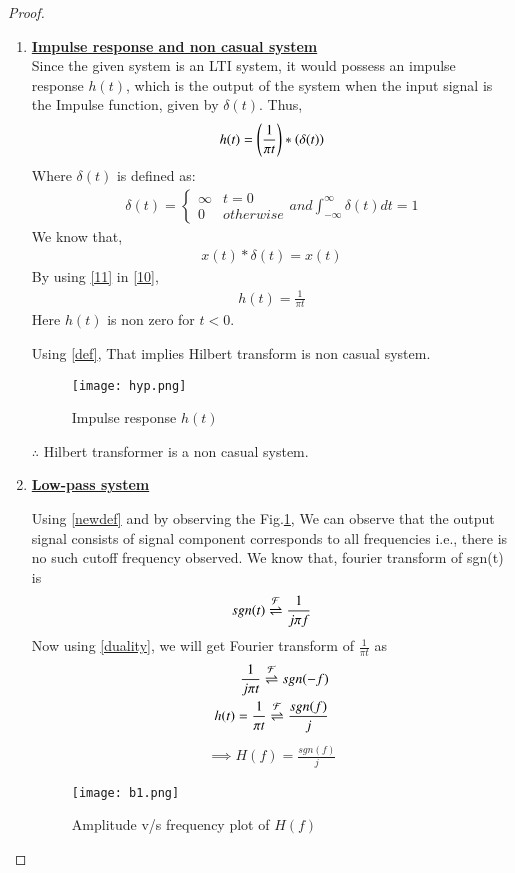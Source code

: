\documentclass[journal,12pt,twocolumn]{IEEEtran}
\begin{document}
\begin{proof}
\begin{enumerate}
\item {\textbf{\underline{Impulse response and non casual system}}}\\
Since the given system is an LTI system, it would possess an impulse response $h(t)$, which is the output of the system when the input signal is the Impulse function, given by $\delta(t)$. Thus,
\begin{align}
    h(t) =\left(\frac{1}{\pi t}\right)\ast \left(\delta(t)\right)\label{10}
\end{align}
Where $\delta(t)$ is defined as:
\begin{align}
\nonumber    \delta(t) = 
    \begin{cases}
\infty & t = 0\\
0 & otherwise
\end{cases}
and \int_{-\infty}^\infty \delta(t)dt  = 1
\end{align}
We know that,
\begin{align}
{x(t)}\ast {\delta(t)}=x(t)\label{11}
\end{align}
By using \eqref{11} in \eqref{10},
\begin{align}
    h(t) = \frac{1}{\pi t}
    \label{H}
\end{align}
Here $h(t)$ is non zero for $t<0$.

Using \eqref{def}, That implies Hilbert transform is non casual system.
 \begin{figure}[!htp]
\centering
 \texttt{[image: hyp.png]}
 \caption{Impulse response $h(t)$}
 \end{figure}
 
$\therefore$ Hilbert transformer is a non casual system.


\item {\textbf{\underline{Low-pass system}}}

Using \eqref{newdef} and by observing the Fig.\ref{figx3}, We can observe that the output signal consists of signal component corresponds to all frequencies i.e., there is no such cutoff frequency observed. 
We know that, fourier transform of sgn(t) is
\begin{align}
    sgn(t)\overset{\mathcal{F}}{ \rightleftharpoons} \frac{1}{j\pi f}
\end{align}
Now using \ref{duality}, we will get Fourier transform of $\frac{1}{\pi t}$ as
\begin{align}
    \frac{1}{j\pi t}\overset{\mathcal{F}}{ \rightleftharpoons} sgn(-f)\\
    h(t)=\frac{1}{\pi t}\overset{\mathcal{F}}{ \rightleftharpoons} \frac{sgn(f)}{j}
\end{align}
\begin{align}
    \implies H(f) = \frac{sgn(f)}{j}
\end{align}
  \begin{figure}[!htp]
\centering
 \texttt{[image: b1.png]}
 \caption{Amplitude v/s frequency plot of $H(f)$}
  \label{figx3}
 \end{figure}
 

\end{enumerate}
\end{proof}
\end{document}

